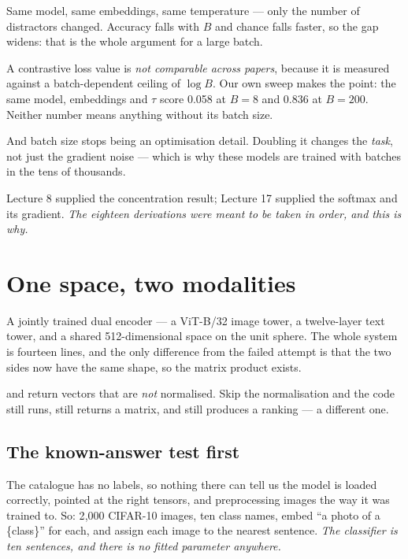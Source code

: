 \documentclass[11pt,a4paper]{article}
\begin{document}
Same model, same embeddings, same temperature --- only the number of
distractors changed. Accuracy falls with $B$ and chance falls faster, so the
gap widens: that is the whole argument for a large batch.

\begin{failbox}[title={Failure condition --- two consequences worth carrying away}]
A contrastive loss value is \emph{not comparable across papers}, because it is
measured against a batch-dependent ceiling of $\log B$. Our own sweep makes the
point: the same model, embeddings and $\tau$ score 0.058 at $B = 8$ and 0.836
at $B = 200$. Neither number means anything without its batch size.

And batch size stops being an optimisation detail. Doubling it changes the
\emph{task}, not just the gradient noise --- which is why these models are
trained with batches in the tens of thousands.
\end{failbox}

Lecture 8 supplied the concentration result; Lecture 17 supplied the softmax
and its gradient. \emph{The eighteen derivations were meant to be taken in
order, and this is why.}

\section{One space, two modalities}

A jointly trained dual encoder --- a ViT-B/32 image tower, a twelve-layer text
tower, and a shared 512-dimensional space on the unit sphere. The whole system
is fourteen lines, and the only difference from the failed attempt is that the
two sides now have the same shape, so the matrix product exists.

\begin{failbox}[title={Failure condition --- one line worth staring at}]
 and  return vectors that
are \emph{not} normalised. Skip the normalisation and the code still runs,
still returns a matrix, and still produces a ranking --- a different one.
\end{failbox}

\subsection{The known-answer test first}

The catalogue has no labels, so nothing there can tell us the model is loaded
correctly, pointed at the right tensors, and preprocessing images the way it
was trained to. So: 2{,}000 CIFAR-10 images, ten class names, embed ``a photo
of a \{class\}'' for each, and assign each image to the nearest sentence.
\emph{The classifier is ten sentences, and there is no fitted parameter
anywhere.}
\end{document}
